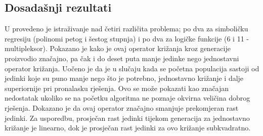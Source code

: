 \subsection{Dosadašnji rezultati}
U \cite{crxSizeFair}  provedeno je istraživanje nad četiri različita problema; po dva za simboličku regresiju (polinomi petog i šestog stupnja) i po dva za logičke funkcije (6 i 11 - multipleksor). Pokazano je kako je ovaj operator križanja kroz generacije proizvodio značajno, pa čak i do deset puta manje jedinke nego jednostavni operator križanja. Uočeno je da je u slučaju kada se početna populacija sastoji od jedinki koje su puno manje nego što je potrebno, jednostavno križanje i dalje superiornije pri pronalasku rješenja. Ovo se može pokazati kao značajan nedostatak ukoliko se na početku algoritma ne poznaje okvirna veličina dobrog rješenja. Dokazano je da ovaj operator značajno smanjuje prekomjeran rast jedinki. Za usporedbu, prosječan rast jedinki tijekom generacija za jednostavno križanje je linearno, dok je prosječan rast jedinki za ovo križanje subkvadratno.